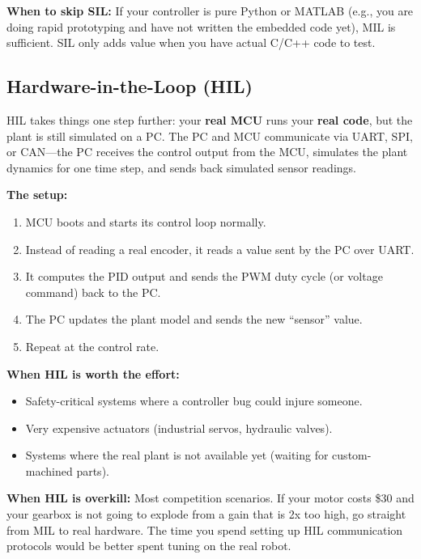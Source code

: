 \textbf{When to skip SIL:} If your controller is pure Python or MATLAB (e.g.,
you are doing rapid prototyping and have not written the embedded code yet),
MIL is sufficient. SIL only adds value when you have actual C/C++ code to
test.

\subsection{Hardware-in-the-Loop (HIL)}

HIL takes things one step further: your \textbf{real MCU} runs your
\textbf{real code}, but the plant is still simulated on a PC. The PC and MCU
communicate via UART, SPI, or CAN---the PC receives the control output from
the MCU, simulates the plant dynamics for one time step, and sends back
simulated sensor readings.

\textbf{The setup:}
\begin{enumerate}
    \item MCU boots and starts its control loop normally.
    \item Instead of reading a real encoder, it reads a value sent by the PC
          over UART.
    \item It computes the PID output and sends the PWM duty cycle (or voltage
          command) back to the PC.
    \item The PC updates the plant model and sends the new ``sensor'' value.
    \item Repeat at the control rate.
\end{enumerate}

\textbf{When HIL is worth the effort:}
\begin{itemize}
    \item Safety-critical systems where a controller bug could injure someone.
    \item Very expensive actuators (industrial servos, hydraulic valves).
    \item Systems where the real plant is not available yet (waiting for
          custom-machined parts).
\end{itemize}

\textbf{When HIL is overkill:} Most competition scenarios. If your motor costs
\$30 and your gearbox is not going to explode from a gain that is 2x too high,
go straight from MIL to real hardware. The time you spend setting up HIL
communication protocols would be better spent tuning on the real robot.

